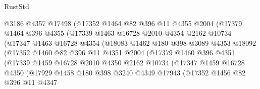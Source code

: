 \begin{lexlean}{RustStd}
\begin{coremodule}
                      @3186
                      @4357
                      @17498
                      (@17352
                        @1464
                        @82
                        @396
                        @11
                        @4355
                        @2004
                        (@17379
                          @1464
                          @396
                          @4355
                          (@17339
                            @1463
                            @16728
                            @2010
                            @4354
                            @2162
                            @10734
                            (@17347
                              @1463
                              @16728
                              @4354
                              (@18083
                                @1462
                                @180
                                @398
                                @3089
                                @4353
                                @18092
                                (@17352
                                  @1460
                                  @82
                                  @396
                                  @11
                                  @4351
                                  @2004
                                  (@17379
                                    @1460
                                    @396
                                    @4351
                                    (@17339
                                      @1459
                                      @16728
                                      @2010
                                      @4350
                                      @2162
                                      @10734
                                      (@17347
                                        @1459
                                        @16728
                                        @4350
                                        (@17929
                                          @1458
                                          @180
                                          @398
                                          @3240
                                          @4349
                                          @17943
                                          (@17352
                                            @1456
                                            @82
                                            @396
                                            @11
                                            @4347

\end{coremodule}
\end{lexlean}
